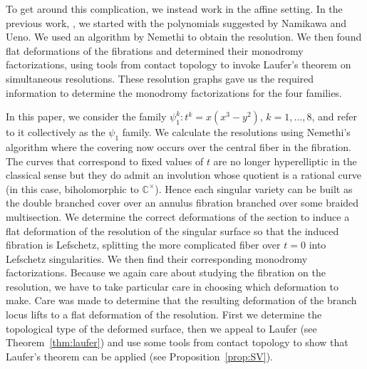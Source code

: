 \documentclass[11pt,letterpaper,reqno]{amsart}
\theoremstyle{remark}
\def \x {\times}
\newcommand{\CC}{{\mathbb C}}
\begin{document}
To get around this complication, we instead work in the affine setting. In the previous work, \cite{SV}, we started with the polynomials suggested by Namikawa and Ueno. We used an algorithm by Nemethi to obtain the resolution. We then found flat deformations of the fibrations and determined their monodromy factorizations, using tools from contact topology to invoke Laufer's theorem on simultaneous resolutions. These resolution graphs gave us the required information to determine the monodromy factorizations for the four families. 

In this paper, we consider the family $\psi_1^k: t^k = x(x^3-y^2)$, $k = 1,\dots, 8$, and refer to it collectively as the $\psi_1$ family. We calculate the resolutions using Nemethi's algorithm where the covering now occurs over the central fiber in the fibration. The curves that correspond to fixed values of $t$ are no longer hyperelliptic in the classical sense but they do admit an involution whose quotient is a rational curve (in this case, biholomorphic to $\CC^\x$). Hence each singular variety can be built as the double branched cover over an annulus fibration branched over some braided multisection. We determine the correct deformations of the section to induce a flat deformation of the resolution of the singular surface so that the induced fibration is Lefschetz, splitting the more complicated fiber over $t=0$ into Lefschetz singularities. We then find their corresponding monodromy factorizations. Because we again care about studying the fibration on the resolution, we have to take particular care in choosing which deformation to make. Care was made to determine that the resulting deformation of the branch locus lifts to a flat deformation of the resolution. First we determine the topological type of the deformed surface, then we appeal to Laufer (see Theorem~\ref{thm:laufer}) and use some tools from contact topology to show that Laufer's theorem can be applied (see Proposition~\ref{prop:SV}). 
\end{document}

